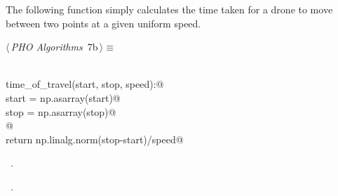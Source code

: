 \documentclass[12.0pt]{report}
\begin{document}
The following function simply calculates the time taken for a drone to move between two points at a given uniform speed. 

\begin{flushleft} \small
\begin{minipage}{\linewidth}\label{scrap3}\raggedright\small
{} $\langle\,${\itshape PHO Algorithms}\nobreak\ {\footnotesize {7b}}$\,\rangle\equiv$
\vspace{-1ex}
\begin{list}{}{} \item
\mbox{}\verb@@\\
\mbox{}\verb@def time_of_travel(start, stop, speed):@\\
\mbox{}\verb@     start = np.asarray(start)@\\
\mbox{}\verb@     stop  = np.asarray(stop)@\\
\mbox{}\verb@    @\\
\mbox{}\verb@     return np.linalg.norm(stop-start)/speed@\\
\mbox{}\verb@@{\NWsep}
\end{list}
\vspace{-1.5ex}
\footnotesize
\begin{list}{}{\setlength{\itemsep}{-\parsep}\setlength{\itemindent}{-\leftmargin}}
\item \NWtxtMacroDefBy\ .
\item \NWtxtMacroRefIn\ .

\item{}
\end{list}
\end{minipage}\vspace{4ex}
\end{flushleft}
\end{document}
